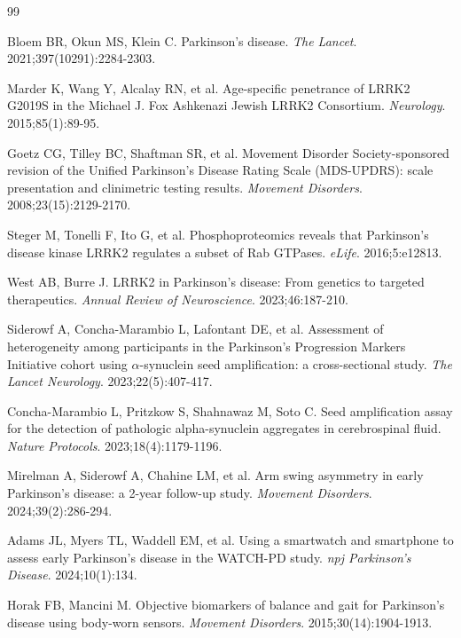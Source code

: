 \documentclass[11pt]{article}
\begin{document}
\begin{thebibliography}{99}

Bloem BR, Okun MS, Klein C. Parkinson's disease. \textit{The Lancet}. 2021;397(10291):2284-2303.

Marder K, Wang Y, Alcalay RN, et al. Age-specific penetrance of LRRK2 G2019S in the Michael J. Fox Ashkenazi Jewish LRRK2 Consortium. \textit{Neurology}. 2015;85(1):89-95.

Goetz CG, Tilley BC, Shaftman SR, et al. Movement Disorder Society-sponsored revision of the Unified Parkinson's Disease Rating Scale (MDS-UPDRS): scale presentation and clinimetric testing results. \textit{Movement Disorders}. 2008;23(15):2129-2170.

Steger M, Tonelli F, Ito G, et al. Phosphoproteomics reveals that Parkinson's disease kinase LRRK2 regulates a subset of Rab GTPases. \textit{eLife}. 2016;5:e12813.

West AB, Burre J. LRRK2 in Parkinson's disease: From genetics to targeted therapeutics. \textit{Annual Review of Neuroscience}. 2023;46:187-210.

Siderowf A, Concha-Marambio L, Lafontant DE, et al. Assessment of heterogeneity among participants in the Parkinson's Progression Markers Initiative cohort using $\alpha$-synuclein seed amplification: a cross-sectional study. \textit{The Lancet Neurology}. 2023;22(5):407-417.

Concha-Marambio L, Pritzkow S, Shahnawaz M, Soto C. Seed amplification assay for the detection of pathologic alpha-synuclein aggregates in cerebrospinal fluid. \textit{Nature Protocols}. 2023;18(4):1179-1196.

Mirelman A, Siderowf A, Chahine LM, et al. Arm swing asymmetry in early Parkinson's disease: a 2-year follow-up study. \textit{Movement Disorders}. 2024;39(2):286-294.

Adams JL, Myers TL, Waddell EM, et al. Using a smartwatch and smartphone to assess early Parkinson's disease in the WATCH-PD study. \textit{npj Parkinson's Disease}. 2024;10(1):134.

Horak FB, Mancini M. Objective biomarkers of balance and gait for Parkinson's disease using body-worn sensors. \textit{Movement Disorders}. 2015;30(14):1904-1913.


\end{thebibliography}
\end{document}
